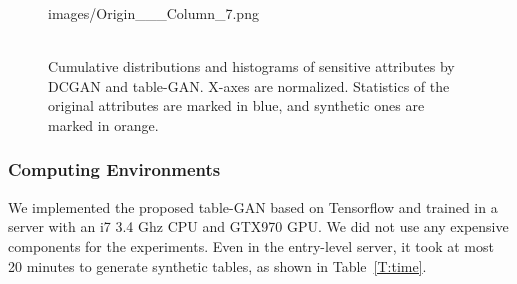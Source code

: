 \begin{figure}[!ht]
{{images/Origin___Column_7.png}}\\
\vspace{-1em}
\\
\vspace{-1em}
\caption{Cumulative distributions and histograms of sensitive attributes by DCGAN and table-GAN. X-axes are normalized. Statistics of the original attributes are marked in blue, and synthetic ones are marked in orange.}\label{fig:cd}
\end{figure}

\subsubsection{Computing Environments}
We implemented the proposed table-GAN based on Tensorflow and trained in a server with an i7 3.4 Ghz CPU and GTX970 GPU. We did not use any expensive components for the experiments. Even in the entry-level server, it took at most 20 minutes to generate synthetic tables, as shown in Table~\ref{T:time}.

